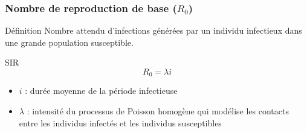 \begin{frame}
        \frametitle{Nombre de reproduction de base ($R_0$)}

        \begin{block}{Définition}
                Nombre attendu d’infections générées par un individu infectieux dans une grande population susceptible.
        \end{block}

        \begin{alertblock}{SIR}
                $$ R_0 =  \lambda i $$
                \begin{itemize}
                        \item $i$ : durée moyenne de la période infectieuse
                        \item $\lambda$ : intensité du processus de Poisson homogène qui modélise les contacts entre les individus infectés et les individus susceptibles
                \end{itemize}
        \end{alertblock}
\end{frame}
